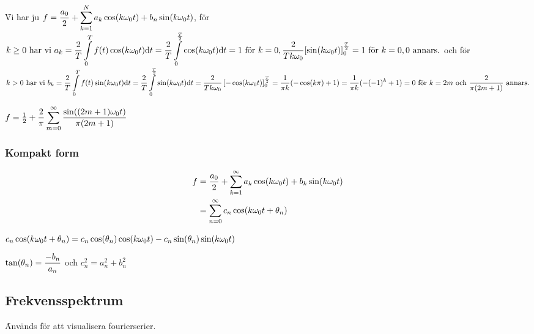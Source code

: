 \documentclass[a4paper]{article}
\begin{document}


\begin{ex}
    \f

    Vi har ju \(
        f = \displaystyle\frac{a_0}{2} + \displaystyle\sum_{k=1}^N a_k \cos(k \omega_0 t) + b_n \sin(k \omega_0 t)
    \), för \(k \geq 0 \text{ har vi } 
        a_k = \displaystyle\frac{2}{T} \displaystyle\int\limits_0^T f(t) \cos(k \omega_0 t)\dd t = \displaystyle\frac{2}{T} \displaystyle\int\limits_0^{\frac{T}{2}} \cos(k \omega_0 t)\dd t = 
        1 \text{ för } k = 0, 
        \displaystyle\frac{2}{Tk\omega_0}[\sin(k\omega_0t)]_0^{\frac{T}{2}} 
        = 1 \text{ för } k = 0, 0 \text{ annars.} 
    \) och för \( k > 0 \text{ har vi } 
        b_k = \displaystyle\frac{2}{T} \displaystyle\int\limits_0^T f(t) \sin(k \omega_0 t)\dd t = 
        \displaystyle\frac{2}{T} \displaystyle\int\limits_0^{\frac{T}{2}} \sin(k \omega_0 t)\dd t =
        \displaystyle\frac{2}{Tk\omega_0}\left[-\cos(k\omega_0t)\right]_0^{\frac{T}{2}} =
        \displaystyle\frac{1}{\pi k} (-\cos(k\pi) + 1) =
        \displaystyle\frac{1}{\pi k} (- (-1)^k + 1) =
        0 \text{ för } k = 2m \text{ och } \displaystyle\frac{2}{\pi(2m+1)} \text{ annars.}  
    \)

    \(
        f = \frac{1}{2} + \displaystyle\frac{2}{\pi} \displaystyle\sum_{m=0}^\infty \displaystyle\frac{\sin((2m+1)\omega_0 t)}{\pi(2m+1)} 
    \) 
\end{ex}

\subsubsection{Kompakt form}
\begin{align*}
    f &= \displaystyle\frac{a_0}{2} + \displaystyle\sum_{k=1}^\infty a_k \cos(k \omega_0 t) + b_k \sin(k \omega_0 t) \\
      &= \displaystyle\sum_{n=0}^\infty c_n \cos(k \omega_0 t + \theta_n)
\end{align*}

\(
    c_n \cos(k \omega_0 t + \theta_n) = c_n \cos(\theta_n) \cos(k \omega_0 t) -  c_n \sin(\theta_n) \sin(k \omega_0 t)
\)    

\(
    \tan(\theta_n) = \displaystyle\frac{-b_n}{a_n} 
\) och \(
    c_n^2 = a_n^2 + b_n^2
\) 

\subsection{Frekvensspektrum}
\f

Används för att visualisera fourierserier.
\end{document}
